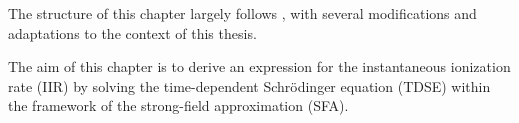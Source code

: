 


The structure of this chapter largely follows \cite{Ivanov20012005}, with several modifications and adaptations to the context of this thesis.

The aim of this chapter is to derive an expression for the instantaneous ionization rate (IIR) by solving the time-dependent Schrödinger equation (TDSE) within the framework of the strong-field approximation (SFA).



